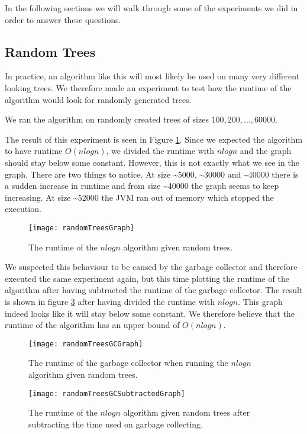 In the following sections we will walk through some of the experiments we did in order to answer these questions.

\subsection{Random Trees}
In practice, an algorithm like this will most likely be used on many very different looking trees. We therefore made an experiment to test how the runtime of the algorithm would look for randomly generated trees.

We ran the algorithm on randomly created trees of sizes $100, 200, ..., 60000$.

The result of this experiment is seen in Figure \ref{randomTreesGraph}. Since we expected the algorithm to have runtime $O(nlogn)$, we divided the runtime with $nlogn$ and the graph should stay below some constant. However, this is not exactly what we see in the graph. There are two things to notice. At size \textasciitilde 5000, \textasciitilde 30000 and \textasciitilde 40000 there is a sudden increase in runtime and from size \textasciitilde 40000 the graph seems to keep increasing. At size \textasciitilde 52000 the JVM ran out of memory which stopped the execution.

\begin{figure}
	\texttt{[image: randomTreesGraph]}
	\caption{The runtime of the $nlogn$ algorithm given random trees.}
	\label{randomTreesGraph}
\end{figure}

We suspected this behaviour to be caused by the garbage collector and therefore executed the same experiment again, but this time plotting the runtime of the algorithm after having subtracted the runtime of the garbage collector. The result is shown in figure \ref{randomTreesGCSubtractedGraph} after having divided the runtime with $nlogn$. This graph indeed looks like it will stay below some constant. We therefore believe that the runtime of the algorithm has an upper bound of $O(nlogn)$.

\begin{figure}
	\texttt{[image: randomTreesGCGraph]}
	\caption{The runtime of the garbage collector when running the $nlogn$ algorithm given random trees.}
	\label{randomTreesGCGraph}
\end{figure}

\begin{figure}
	\texttt{[image: randomTreesGCSubtractedGraph]}
	\caption{The runtime of the $nlogn$ algorithm given random trees after subtracting the time used on garbage collecting.}
	\label{randomTreesGCSubtractedGraph}
\end{figure}

